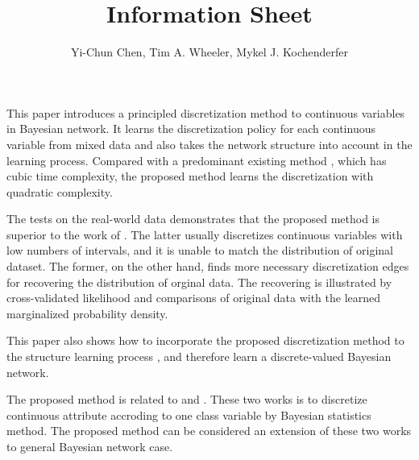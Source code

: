 \documentclass{article}
\title{Information Sheet}
\author{Yi-Chun Chen, Tim A. Wheeler, Mykel J. Kochenderfer}
\begin{document}
\maketitle

This paper introduces a principled discretization method to continuous variables in Bayesian network. It learns the discretization policy for each continuous variable from mixed data and also takes the network structure into account in the learning process. Compared with a predominant existing method \citep{Friedman_1996}, which has cubic time complexity, the proposed method learns the discretization with quadratic complexity.

The tests on the real-world data \citep{Lichman_2013} demonstrates that the proposed method is superior to the work of \cite{Friedman_1996}. The latter usually discretizes continuous variables with low numbers of intervals, and it is unable to match the distribution of original dataset. The former, on the other hand, finds more necessary discretization edges for recovering the distribution of orginal data. The recovering is illustrated by cross-validated likelihood and comparisons of original data with the learned marginalized probability density.

This paper also shows how to incorporate the proposed discretization method to the structure learning process \cite{k2}, and therefore learn a discrete-valued Bayesian network.


The proposed method is related to \cite{Boulle_2006} and \cite{Lustgarten_2011}. These two works is to discretize continuous attribute accroding to one class variable by Bayesian statistics method. The proposed method can be considered an extension of these two works to general Bayesian network case.



\end{document}

